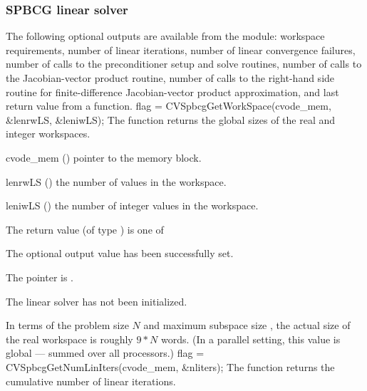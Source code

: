 \subsubsection{SPBCG linear solver}\label{sss:optout_spbcg}
The following optional outputs are available from the {\cvspbcg}
module: workspace requirements, number of linear iterations, number of
linear convergence failures, number of calls to the preconditioner
setup and solve routines, number of calls to the Jacobian-vector
product routine, number of calls to the right-hand side routine for
finite-difference Jacobian-vector product approximation, and last
return value from a {\cvspbcg} function.
{
  flag = CVSpbcgGetWorkSpace(cvode\_mem, \&lenrwLS, \&leniwLS);
}
{
  The function  returns the global sizes of the
  {\cvspbcg} real and integer workspaces.
}
{
  \begin{args}
  \item[cvode\_mem] ()
    pointer to the {\cvode} memory block.
  \item[lenrwLS] ()
    the number of  values in the {\cvspbcg} workspace.
  \item[leniwLS] ()
    the number of integer values in the {\cvspbcg} workspace.
  \end{args}
}
{
  The return value  (of type ) is one of
  \begin{args}
  \item[\Id{CVSPBCG\_SUCCESS}] 
    The optional output value has been successfully set.
  \item[\Id{CVSPBCG\_MEM\_NULL}]
    The  pointer is .
  \item[\Id{CVSPBCG\_LMEM\_NULL}]
    The {\cvspbcg} linear solver has not been initialized.
  \end{args}
}
{
  In terms of the problem size $N$ and maximum subspace size , 
  the actual size of the real workspace is roughly $9*N$  words.
  (In a parallel setting, this value is global --- summed over all processors.)
}
{
  flag = CVSpbcgGetNumLinIters(cvode\_mem, \&nliters);
}
{
  The function  returns the
  cumulative number of linear iterations.
}
